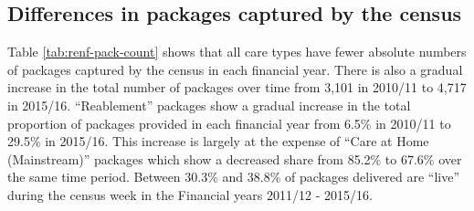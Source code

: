 \documentclass[]{article}
\begin{document}
\FloatBarrier

\subsection{Differences in packages captured by the census}\label{subsec:renf-pack-diff}

\begin{table}[]
\centering
\caption{Count of packages by care type}
\label{tab:renf-pack-count}
\end{table}

Table \ref{tab:renf-pack-count} shows that all care types have fewer
absolute numbers of packages captured by the census in each financial
year. There is also a gradual increase in the total number of packages
over time from 3,101 in 2010/11 to 4,717 in 2015/16. ``Reablement''
packages show a gradual increase in the total proportion of packages
provided in each financial year from 6.5\% in 2010/11 to 29.5\% in
2015/16. This increase is largely at the expense of ``Care at Home
(Mainstream)'' packages which show a decreased share from 85.2\% to
67.6\% over the same time period. Between 30.3\% and 38.8\% of packages
delivered are ``live'' during the census week in the Financial years
2011/12 - 2015/16.
\end{document}
